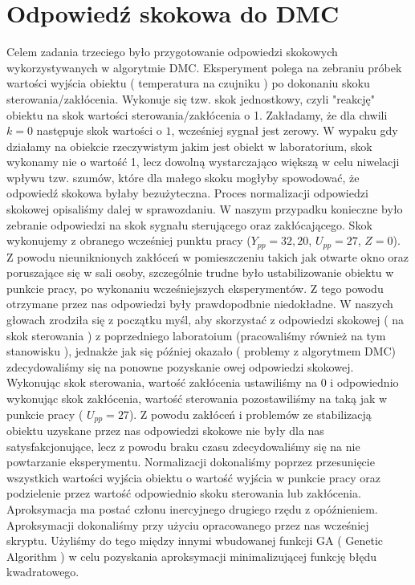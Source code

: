\chapter{Odpowiedź skokowa do DMC}
Celem zadania trzeciego było przygotowanie odpowiedzi skokowych wykorzystywanych w algorytmie DMC. Eksperyment polega na zebraniu próbek wartości
wyjścia obiektu ( temperatura na czujniku ) po dokonaniu skoku sterowania/zakłócenia. Wykonuje się tzw. skok jednostkowy, czyli "reakcję" obiektu
na skok wartości sterowania/zakłócenia o 1. Zakładamy, że dla chwili $k=0$ następuje skok wartości o $1$, wcześniej sygnał jest zerowy. W wypaku gdy działamy
na obiekcie rzeczywistym jakim jest obiekt w laboratorium, skok wykonamy nie o wartość 1, lecz dowolną wystarczająco większą w celu niwelacji wpływu tzw. szumów,
które dla małego skoku mogłyby spowodować, że odpowiedź skokowa byłaby bezużyteczna. Proces normalizacji odpowiedzi skokowej opisaliśmy dalej w sprawozdaniu. W naszym
przypadku konieczne było zebranie odpowiedzi na skok sygnału sterującego oraz zakłócającego. Skok wykonujemy
z obranego wcześniej punktu pracy ($Y_{pp} = 32,20$, $U_{pp} = 27$, $Z = 0$). Z powodu nieuniknionych zakłóceń
w pomieszczeniu takich jak otwarte okno oraz poruszające się w sali osoby, szczególnie trudne było ustabilizowanie obiektu w punkcie pracy, po wykonaniu wcześniejszych
eksperymentów. Z tego powodu otrzymane przez nas odpowiedzi były prawdopodbnie niedokładne. W naszych głowach
zrodziła się z początku myśl, aby skorzystać z odpowiedzi skokowej ( na skok sterowania ) z poprzedniego laboratoium
(pracowaliśmy również na tym stanowisku ), jednakże jak się później okazało ( problemy z algorytmem DMC) zdecydowaliśmy się
na ponowne pozyskanie owej odpowiedzi skokowej. Wykonując skok sterowania, wartość zakłócenia ustawiliśmy na 0 i odpowiednio
wykonując skok zakłócenia, wartość sterowania pozostawiliśmy na taką jak w punkcie pracy ( $U_{pp} = 27$).
Z powodu zakłóceń i problemów ze stabilizacją obiektu uzyskane przez nas odpowiedzi skokowe nie były dla nas satysfakcjonujące,
lecz z powodu braku czasu zdecydowaliśmy się na nie powtarzanie eksperymentu. Normalizacji dokonaliśmy
poprzez przesunięcie wszystkich wartości wyjścia obiektu o wartość wyjścia w punkcie pracy oraz podzielenie przez wartość odpowiednio
skoku sterowania lub zakłócenia. Aproksymacja ma postać członu inercyjnego drugiego rzędu z opóźnieniem. Aproksymacji dokonaliśmy przy użyciu
opracowanego przez nas wcześniej skryptu. Użyliśmy do tego między innymi wbudowanej funkcji GA ( Genetic
Algorithm ) w celu pozyskania aproksymacji minimalizującej funkcję błędu kwadratowego.

